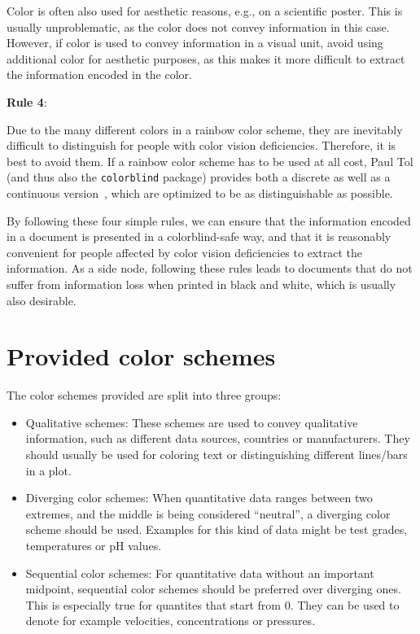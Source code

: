 \documentclass{scrartcl}
\begin{document}
Color is often also used for aesthetic reasons, e.g., on a scientific poster.
This is usually unproblematic, as the color does not convey information in this case.
However, if color is used to convey information in a visual unit, avoid using additional color for aesthetic purposes, as this makes it more difficult to extract the information encoded in the color.

\begin{center}
    \setlength{\fboxrule}{1pt}
    \textbf{Rule 4}:
\end{center}

Due to the many different colors in a rainbow color scheme, they are inevitably difficult to distinguish for people with color vision deficiencies.
Therefore, it is best to avoid them.
If a rainbow color scheme has to be used at all cost, Paul Tol (and thus also the \texttt{colorblind} package) provides both a discrete as well as a continuous version~\cite{Tol}, which are optimized to be as distinguishable as possible.

By following these four simple rules, we can ensure that the information encoded in a document is presented in a colorblind-safe way, and that it is reasonably convenient for people affected by color vision deficiencies to extract the information.
As a side node, following these rules leads to documents that do not suffer from information loss when printed in black and white, which is usually also desirable.

\section{Provided color schemes}\label{sec:colors}
The color schemes provided are split into three groups:
\begin{itemize}
    \item Qualitative schemes:\newline
        These schemes are used to convey qualitative information, such as different data sources, countries or manufacturers.
        They should usually be used for coloring text or distinguishing different lines/bars in a plot.
    \item Diverging color schemes:\newline
        When quantitative data ranges between two extremes, and the middle is being considered ``neutral'', a diverging color scheme should be used.
        Examples for this kind of data might be test grades, temperatures or pH values.
    \item Sequential color schemes:\newline
        For quantitative data without an important midpoint, sequential color schemes should be preferred over diverging ones.
        This is especially true for quantites that start from $0$.
        They can be used to denote for example velocities, concentrations or pressures.
\end{itemize}
\end{document}
